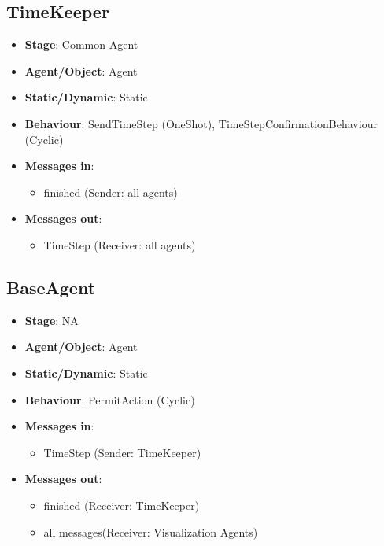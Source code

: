 \documentclass[12pt]{article}
\begin{document}
\subsection{TimeKeeper}
\begin{itemize}
    \item \textbf{Stage}: Common Agent
    \item \textbf{Agent/Object}: Agent
    \item \textbf{Static/Dynamic}: Static
    \item \textbf{Behaviour}: SendTimeStep (OneShot), TimeStepConfirmationBehaviour (Cyclic)
    \item \textbf{Messages in}: 
        \begin{itemize}
            \item  finished (Sender: all agents)
        \end{itemize}
    \item \textbf{Messages out}:
        \begin{itemize}
            \item  TimeStep (Receiver: all agents)
        \end{itemize}
\end{itemize}

\subsection{BaseAgent}
\begin{itemize}
    \item \textbf{Stage}: NA
    \item \textbf{Agent/Object}: Agent
    \item \textbf{Static/Dynamic}: Static  
    \item \textbf{Behaviour}: PermitAction (Cyclic)
    \item \textbf{Messages in}:
        \begin{itemize}
            \item  TimeStep (Sender: TimeKeeper)
        \end{itemize}
    \item \textbf{Messages out}:
        \begin{itemize}
            \item  finished (Receiver: TimeKeeper)
            \item  all messages(Receiver: Visualization Agents)
        \end{itemize}
\end{itemize}
\newpage{}
\end{document}
